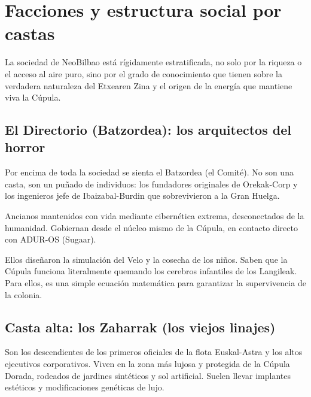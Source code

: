 \chapter{Facciones y estructura social por castas}

La sociedad de NeoBilbao está rígidamente estratificada, no solo por la riqueza o el acceso al aire puro, sino por el grado de conocimiento que tienen sobre la verdadera naturaleza del Etxearen Zina y el origen de la energía que mantiene viva la Cúpula.


\section{El Directorio (Batzordea): los arquitectos del horror}

Por encima de toda la sociedad se sienta el Batzordea (el Comité). No son una casta, son un puñado de individuos: los fundadores originales de Orekak-Corp y los ingenieros jefe de Ibaizabal-Burdin que sobrevivieron a la Gran Huelga.

 Ancianos mantenidos con vida mediante cibernética extrema, desconectados de la humanidad. Gobiernan desde el núcleo mismo de la Cúpula, en contacto directo con ADUR-OS (Sugaar).

 Ellos diseñaron la simulación del Velo y la cosecha de los niños. Saben que la Cúpula funciona literalmente quemando los cerebros infantiles de los Langileak. Para ellos, es una simple ecuación matemática para garantizar la supervivencia de la colonia.


\section{Casta alta: los Zaharrak (los viejos linajes)}

Son los descendientes de los primeros oficiales de la flota Euskal-Astra y los altos ejecutivos corporativos. Viven en la zona más lujosa y protegida de la Cúpula Dorada, rodeados de jardines sintéticos y sol artificial. Suelen llevar implantes estéticos y modificaciones genéticas de lujo.

